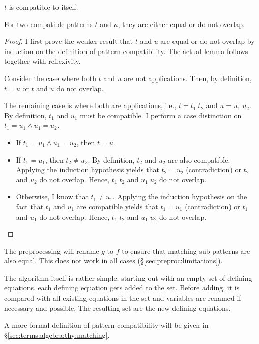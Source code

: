 \begin{lemma}[Reflexivity]
  $t$ is compatible to itself.
\end{lemma}

\begin{lemma}\label{thm:preproc:compatibility:cases}
  For two compatible patterns $t$ and $u$, they are either equal or do not overlap.
\end{lemma}

\begin{proof}
  I first prove the weaker result that $t$ and $u$ are equal or do not overlap by induction on the definition of pattern compatibility.
  The actual lemma follows together with reflexivity.

  Consider the case where both $t$ and $u$ are not applications.
  Then, by definition, $t = u$ or $t$ and $u$ do not overlap.

  The remaining case is where both are applications, i.e., $t = t_1\;t_2$ and $u = u_1\;u_2$.
  By definition, $t_1$ and $u_1$ must be compatible.
  I perform a case distinction on $t_1 = u_1 \wedge u_1 = u_2$.
  \begin{itemize}
    \item
      If $t_1 = u_1 \wedge u_1 = u_2$, then $t = u$.
    \item
      If $t_1 = u_1$, then $t_2 \neq u_2$.
      By definition, $t_2$ and $u_2$ are also compatible.
      Applying the induction hypothesis yields that $t_2 = u_2$ (contradiction) or $t_2$ and $u_2$ do not overlap.
      Hence, $t_1\;t_2$ and $u_1\;u_2$ do not overlap.
    \item
      Otherwise, I know that $t_1 \neq u_1$.
      Applying the induction hypothesis on the fact that $t_1$ and $u_1$ are compatible yields that $t_1 = u_1$ (contradiction) or $t_1$ and $u_1$ do not overlap.
      Hence, $t_1\;t_2$ and $u_1\;u_2$ do not overlap. \qedhere
  \end{itemize}
\end{proof}

\noindent
The preprocessing will rename $g$ to $f$ to ensure that matching sub-patterns are also equal.
This does not work in all cases (§\ref{sec:preproc:limitations}).

The algorithm itself is rather simple:
starting out with an empty set of defining equations, each defining equation gets added to the set.
Before adding, it is compared with all existing equations in the set and variables are renamed if necessary and possible.
The resulting set are the new defining equations.

A more formal definition of pattern compatibility will be given in §\ref{sec:terms:algebra:thy:matching}.